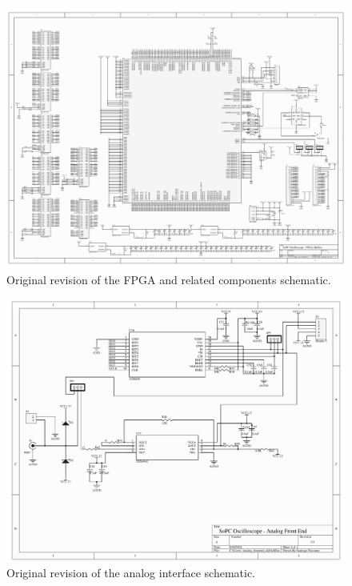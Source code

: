 \documentclass[titlepage]{scrartcl}
\begin{document}
\begin{appendices}
	\begin{figure}[h!]
	\vspace{-2cm}
	\centerline{\includegraphics[width=26cm, angle=90, origin=c]{img/fpga_sch_old.pdf}}
                	\caption{Original revision of the FPGA and related components schematic.}
               	\label{fig:orig_schem_1}
	\end{figure}

	\begin{figure}[h!]
	\vspace{-2cm}
	\centerline{\includegraphics[width=26cm, angle=90, origin=c]{img/analog_interface_old.pdf}}
                	\caption{Original revision of the analog interface schematic.}
               	\label{fig:orig_schem_2}
	\end{figure}


\end{appendices}
\end{document}
